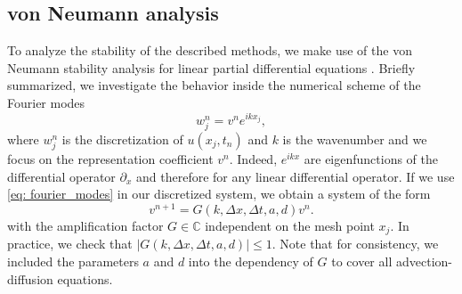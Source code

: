 \subsection{von Neumann analysis}
\label{sec: stability_theory_PDE}
To analyze the stability of the described methods, we make use of the von Neumann stability analysis for linear partial differential equations \cite{leveque2007finite}.
Briefly summarized, we investigate the behavior inside the numerical scheme of the Fourier modes
\begin{equation}\label{eq: fourier_modes}
w^n_j = v^ne^{ikx_j},
\end{equation}
where $w^n_j$ is the discretization of $u(x_j, t_n)$ and $k$ is the wavenumber and we focus on the representation coefficient $v^n$. 
Indeed, $e^{ikx}$ are eigenfunctions of the differential operator $\partial_x$ and therefore for any linear differential operator. 
If we use \eqref{eq: fourier_modes} in our discretized system, we obtain a system of the form
\begin{equation}
\label{eq: ampfactor}
v^{n+1}=G(k, \Delta x, \Delta t, a, d)v^n.
\end{equation}
with the amplification factor $G\in \mathbb{C}$ independent on the mesh point $x_j$.
In practice, we check that $\lvert G (k, \Delta x, \Delta t, a, d) \rvert \le 1$. 
Note that for consistency, we included the parameters $a$ and $d$ into the dependency of $G$ to cover all advection-diffusion equations. \\
